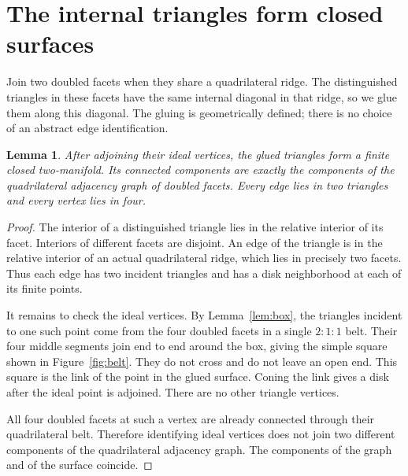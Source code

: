 \documentclass[11pt]{article}
\newtheorem{lemma}[theorem]{Lemma}
\theoremstyle{remark}
\begin{document}
\section{The internal triangles form closed surfaces}

Join two doubled facets when they share a quadrilateral ridge.
The distinguished triangles in these facets have the same internal
diagonal in that ridge, so we glue them along this diagonal. The
gluing is geometrically defined; there is no choice of an abstract
edge identification.

\begin{lemma}\label{lem:surface}
After adjoining their ideal vertices, the glued triangles form a
finite closed two-manifold. Its connected components are exactly
the components of the quadrilateral adjacency graph of doubled facets.
Every edge lies in two triangles and every vertex lies in four.
\end{lemma}
\begin{proof}
The interior of a distinguished triangle lies in the relative
interior of its facet. Interiors of different facets are disjoint.
An edge of the triangle is in the relative interior of an actual
quadrilateral ridge, which lies in precisely two facets. Thus each
edge has two incident triangles and has a disk neighborhood at
each of its finite points.

It remains to check the ideal vertices. By Lemma~\ref{lem:box},
the triangles incident to one such point come from the four doubled
facets in a single $2:1:1$ belt. Their four middle segments join
end to end around the box, giving the simple square shown in
Figure~\ref{fig:belt}. They do not cross and do not leave an open
end. This square is the link of the point in the glued surface.
Coning the link gives a disk after the ideal point is adjoined.
There are no other triangle vertices.

All four doubled facets at such a vertex are already connected
through their quadrilateral belt. Therefore identifying ideal
vertices does not join two different components of the quadrilateral
adjacency graph. The components of the graph and of the surface
coincide.
\end{proof}
\end{document}
